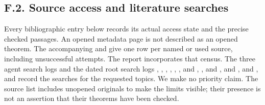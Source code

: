 \subsection{F.2. Source access and literature searches}
Every bibliographic entry below records its actual access state and the
precise checked passages. An opened metadata page is not described as
an opened theorem. The accompanying 
and  give one row per named or used source,
including unsuccessful attempts. The report incorporates that census.
The three agent search logs and the dated root search logs
, ,
, ,
, , and
, , and
, and
, and
, and
record the searches for the requested topics. We make no priority claim.
The source list includes unopened originals to make the limits visible;
their presence is not an assertion that their theorems have been checked.
